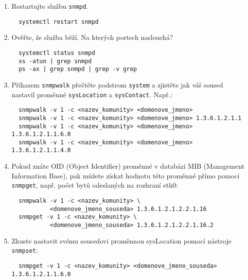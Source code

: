 \begin{itemize}
\begin{enumerate}
\begin{enumerate}
{           <COMMUNITY> 10.10.10.0/24} a lokálnímu počítači i zápis {\tt rwcommunity <COMMUNITY>
           localhost}
           \item V konfiguračním souboru ještě nastavte SNMP proměnnou {\tt sysContact}
           na Vámi vymyšlenou hodnotu. Takto nastavená proměnná bude vždy pouze pro čtení bez ohledu
           na nastavení přístupových pravidel. Zakomentujte nastavení proměnné
               sysLocation.
           \item Nastavte proměnnou sysLocation pomocí příkazu {\tt snmpset}
\begin{verbatim}
  snmpset -v1 -c <nazev_komunity> localhost 1.3.6.1.2.1.1.6.0 s <retezec>
\end{verbatim}
           \end{enumerate}
            \item Restartujte službu {\tt snmpd}.
\begin{verbatim}
  systemctl restart snmpd
\end{verbatim} 
            \item Ověřte, že služba běží. Na kterých portech naslouchá?
\begin{verbatim}
  systemctl status snmpd
  ss -atun | grep snmpd
  ps -ax | grep snmpd | grep -v grep
\end{verbatim} 
          \item Příkazem {\tt snmpwalk} přečtěte podstrom {\tt system} a zjistěte jak váš
          soused nastavil proměnné {\tt sysLocation} a {\tt sysContact}. Např.:
\begin{verbatim}
  snmpwalk -v 1 -c <nazev_komunity> <domenove_jmeno>
  snmpwalk -v 1 -c <nazev_komunity> <domenove_jmeno> 1.3.6.1.2.1.1
  snmpwalk -v 1 -c <nazev_komunity> <domenove_jmeno> 1.3.6.1.2.1.1.6.0
  snmpwalk -v 1 -c <nazev_komunity> <domenove_jmeno> 1.3.6.1.2.1.1.4.0
\end{verbatim}

          \item Pokud znáte OID (Object Identifier) proměnné v databázi MIB (Management Information Base), pak
          můžete získat hodnotu této proměnné
          přímo pomocí {\tt snmpget}, např. počet bytů odeslaných na rozhraní eth0:
\begin{verbatim}
  snmpwalk -v 1 -c <nazev_komunity> \
           <domenove_jmeno_souseda> 1.3.6.1.2.1.2.2.1.16
  snmpget -v 1 -c <nazev_komunity> \
           <domenove_jmeno_souseda> 1.3.6.1.2.1.2.2.1.16.2
\end{verbatim}
          \item Zkuste nastavit svému sousedovi proměnnou sysLocation
          pomocí nástroje {\tt snmpset}:
\begin{verbatim}
  snmpget -v 1 -c <nazev_komunity> <domenove_jmeno_souseda> 1.3.6.1.2.1.1.6.0


\end{verbatim}
\end{enumerate}
\end{itemize}
